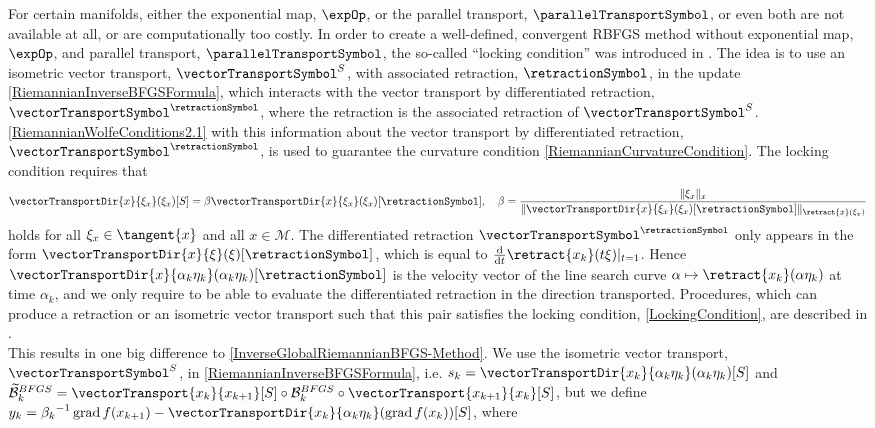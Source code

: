 For certain manifolds, either the exponential map, $\expOp$, or the parallel transport, $\parallelTransportSymbol$, or even both are not available at all, or are computationally too costly. In order to create a well-defined, convergent RBFGS method without exponential map, $\expOp$, and parallel transport, $\parallelTransportSymbol$, the so-called “locking condition” was introduced in \cite{HuangGallivanAbsil:2015}. The idea is to use an isometric vector transport, $\vectorTransportSymbol^S$, with associated retraction, $\retractionSymbol$, in the update \cref{RiemannianInverseBFGSFormula}, which interacts with the vector transport by differentiated retraction, $\vectorTransportSymbol^{\retractionSymbol}$, where the retraction is the associated retraction of $\vectorTransportSymbol^S$. \cref{RiemannianWolfeConditions2.1} with this information about the vector transport by differentiated retraction, $\vectorTransportSymbol^{\retractionSymbol}$, is used to guarantee the curvature condition \cref{RiemannianCurvatureCondition}. The locking condition requires that
\begin{equation}\label{LockingCondition}
	\vectorTransportDir{x}{\xi_x}(\xi_x)[S] = \beta \vectorTransportDir{x}{\xi_x}(\xi_x)[\retractionSymbol], \quad \beta = \frac{\lVert \xi_x \rVert_x}{\lVert \vectorTransportDir{x}{\xi_x}(\xi_x)[\retractionSymbol] \rVert_{\retract{x}(\xi_x)}}
\end{equation}
holds for all $\xi_x \in \tangent{x}$ and all $x \in \mathcal{M}$. The differentiated retraction $\vectorTransportSymbol^{\retractionSymbol}$ only appears in the form $\vectorTransportDir{x}{\xi}(\xi)[\retractionSymbol]$, which is equal to $\frac{\mathrm{d}}{\mathrm{d}t} \retract{x_k}(t \xi)\vert_{t=1}$. Hence $\vectorTransportDir{x}{\alpha_k \eta_k}(\alpha_k \eta_k)[\retractionSymbol]$ is the velocity vector of the line search curve $\alpha \mapsto \retract{x_k}(\alpha \eta_k)$ at time $\alpha_k$, and we only require to be able to evaluate the differentiated retraction in the direction transported. Procedures, which can produce a retraction or an isometric vector transport such that this pair satisfies the locking condition, \cref{LockingCondition}, are described in \cite[4.~Ensuring~the~locking~condition]{HuangGallivanAbsil:2015}. \\
This results in one big difference to \cref{InverseGlobalRiemannianBFGS-Method}. We use the isometric vector transport, $\vectorTransportSymbol^S$, in \cref{RiemannianInverseBFGSFormula}, i.e. $s_k = \vectorTransportDir{x_k}{\alpha_k \eta_k}(\alpha_k \eta_k)[S]$ and $\widetilde{\mathcal{B}}^{BFGS}_k = \vectorTransport{x_k}{x_{k+1}}[S] \circ \mathcal{B}^{BFGS}_k \circ \vectorTransport{x_{k+1}}{x_k}[S]$, but we define $y_k = {\beta_k}^{-1} \operatorname{grad} f(x_{k+1}) - \vectorTransportDir{x_k}{\alpha_k \eta_k}(\operatorname{grad} f(x_k))[S]$, where 
